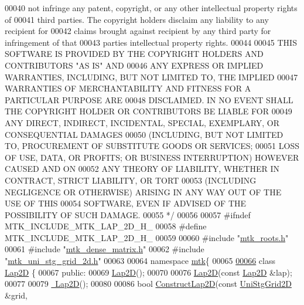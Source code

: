 \begin{DoxyCode}
00040 \textcolor{comment}{not infringe any patent, copyright, or any other intellectual property rights of}
00041 \textcolor{comment}{third parties. The copyright holders disclaim any liability to any recipient for}
00042 \textcolor{comment}{claims brought against recipient by any third party for infringement of that}
00043 \textcolor{comment}{parties intellectual property rights.}
00044 \textcolor{comment}{}
00045 \textcolor{comment}{THIS SOFTWARE IS PROVIDED BY THE COPYRIGHT HOLDERS AND CONTRIBUTORS "AS IS" AND}
00046 \textcolor{comment}{ANY EXPRESS OR IMPLIED WARRANTIES, INCLUDING, BUT NOT LIMITED TO, THE IMPLIED}
00047 \textcolor{comment}{WARRANTIES OF MERCHANTABILITY AND FITNESS FOR A PARTICULAR PURPOSE ARE}
00048 \textcolor{comment}{DISCLAIMED. IN NO EVENT SHALL THE COPYRIGHT HOLDER OR CONTRIBUTORS BE LIABLE FOR}
00049 \textcolor{comment}{ANY DIRECT, INDIRECT, INCIDENTAL, SPECIAL, EXEMPLARY, OR CONSEQUENTIAL DAMAGES}
00050 \textcolor{comment}{(INCLUDING, BUT NOT LIMITED TO, PROCUREMENT OF SUBSTITUTE GOODS OR SERVICES;}
00051 \textcolor{comment}{LOSS OF USE, DATA, OR PROFITS; OR BUSINESS INTERRUPTION) HOWEVER CAUSED AND ON}
00052 \textcolor{comment}{ANY THEORY OF LIABILITY, WHETHER IN CONTRACT, STRICT LIABILITY, OR TORT}
00053 \textcolor{comment}{(INCLUDING NEGLIGENCE OR OTHERWISE) ARISING IN ANY WAY OUT OF THE USE OF THIS}
00054 \textcolor{comment}{SOFTWARE, EVEN IF ADVISED OF THE POSSIBILITY OF SUCH DAMAGE.}
00055 \textcolor{comment}{*/}
00056 
00057 \textcolor{preprocessor}{#ifndef MTK\_INCLUDE\_MTK\_LAP\_2D\_H\_}
00058 \textcolor{preprocessor}{#define MTK\_INCLUDE\_MTK\_LAP\_2D\_H\_}
00059 
00060 \textcolor{preprocessor}{#include "\hyperlink{mtk__roots_8h}{mtk\_roots.h}"}
00061 \textcolor{preprocessor}{#include "\hyperlink{mtk__dense__matrix_8h}{mtk\_dense\_matrix.h}"}
00062 \textcolor{preprocessor}{#include "\hyperlink{mtk__uni__stg__grid__2d_8h}{mtk\_uni\_stg\_grid\_2d.h}"}
00063 
00064 \textcolor{keyword}{namespace }\hyperlink{namespacemtk}{mtk}\{
00065 
\hypertarget{mtk__lap__2d_8h_source_l00066}{}\hyperlink{classmtk_1_1Lap2D}{00066} \textcolor{keyword}{class }\hyperlink{classmtk_1_1Lap2D}{Lap2D} \{
00067  \textcolor{keyword}{public}:
00069   \hyperlink{classmtk_1_1Lap2D_ada4370fb8d7726e70a3257e3841c6d1f}{Lap2D}();
00070 
00076   \hyperlink{classmtk_1_1Lap2D_ada4370fb8d7726e70a3257e3841c6d1f}{Lap2D}(\textcolor{keyword}{const} \hyperlink{classmtk_1_1Lap2D}{Lap2D} &lap);
00077 
00079   \hyperlink{classmtk_1_1Lap2D_a8ca8447a4da7a5ddcf826486992374a5}{~Lap2D}();
00080 
00086   \textcolor{keywordtype}{bool} \hyperlink{classmtk_1_1Lap2D_a188ee8fee643463affca7de2884711b1}{ConstructLap2D}(\textcolor{keyword}{const} \hyperlink{classmtk_1_1UniStgGrid2D}{UniStgGrid2D} &grid,

\end{DoxyCode}
